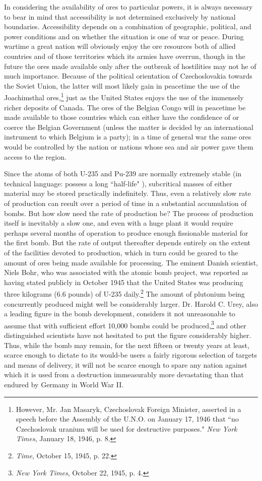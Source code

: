 In considering the availability of ores to particular powers, it is always necessary to bear in mind that accessibility is not determined exclusively by national boundaries. Accessibility depends on a combination of geographic, political, and power conditions and on whether the situation is one of war or peace. During wartime a great nation will obviously enjoy the ore resources both of allied countries and of those territories which its armies have overrun, though in the future the ores made available only after the outbreak of hostilities may not he of much importance. Because of the political orientation of Czechoslovakia towards the Soviet Union, the latter will most likely gain in peacetime the use of the Joachimsthal ores,\footnote{However, Mr. Jan Masaryk, Czechoslovak Foreign Minister, asserted in a speech before the Assembly of the U.N.O. on January 17, 1946 that ``no Czechoslovak uranium will be used for destructive purposes." \textit{New York Times}, January 18, 1946, p. 8.} just as the United States enjoys the use of the immensely richer deposits of Canada. The ores of the Belgian Congo will in peacetime be made available to those countries which can either have the confidence of or coerce the Belgian Government (unless the matter is decided by an international instrument to which Belgium is a party); in a time of general war the same ores would be controlled by the nation or nations whose sea and air power gave them access to the region.

Since the atoms of both U-235 and Pu-239 are normally extremely stable (in technical language: possess a long ``half-life" ), subcritical masses of either material may be stored practically indefinitely. Thus, even a relatively slow rate of production can result over a period of time in a substantial accumulation of bombs. But how slow need the rate of production be? The process of production itself is inevitably a slow one, and even with a huge plant it would require perhaps several months of operation to produce enough fissionable material for the first bomb. But the rate of output thereafter depends entirely on the extent of the facilities devoted to production, which in turn could be geared to the amount of ores being made available for processing. The eminent Danish scientist, Niels Bohr, who was associated with the atomic bomb project, was reported as having stated publicly in October 1945 that the United States was producing three kilograms (6.6 pounds) of U-235 daily.\footnote{\emph{Time}, October 15, 1945, p. 22.} The amount of plutonium being concurrently produced might well be considerably larger. Dr. Harold C. Urey, also a leading figure in the bomb development, considers it not unreasonable to assume that with sufficient effort 10,000 bombs could be produced,\footnote{\textit{New York Times}, October 22, 1945, p. 4.} and other distinguished scientists have not hesitated to put the figure considerably higher. Thus, while the bomb may remain, for the next fifteen or twenty years at least, scarce enough to dictate to its would-be users a fairly rigorous selection of targets and means of delivery, it will not be scarce enough to spare any nation against which it is used from a destruction immeasurably more devastating than that endured by Germany in World War II.

